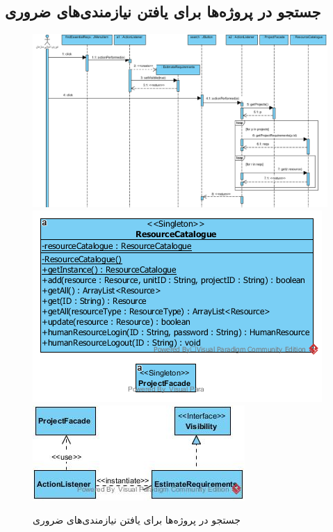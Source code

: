 \begin{landscape}
\section{جستجو در پروژه‌ها برای یافتن نیازمندی‌های ضروری}
\begin{figure}[H]
	\centering
	\includegraphics[scale=0.55]{img/sequence-design/SearchForEssentialRequirements}
	\includegraphics[scale=0.55]{img/sequence-design/SearchForEssentialRequirementsC}
	\includegraphics[scale=0.55]{img/sequence-design/SearchForEssentialRequirementsUI}
	\caption{جستجو در پروژه‌ها برای یافتن نیازمندی‌های ضروری}
\end{figure}

\newpage

\end{landscape}
